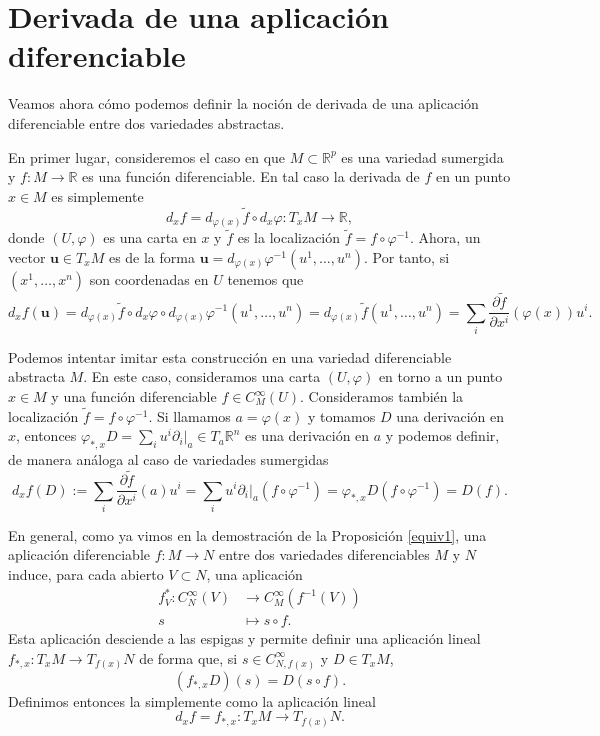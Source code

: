\documentclass[12pt,a4paper]{book}
\theoremstyle{definition} \newtheorem{defn}[thm]{Definición}
\theoremstyle{definition} \newtheorem{ejemplo}[thm]{Ejemplo}
\theoremstyle{definition} \newtheorem{ejercicio}[thm]{Ejercicio}
\theoremstyle{remark} \newtheorem*{obs}{Observación}
\def\RR{\mathbb{R}}
\newcommand{\ve}[1]{\mathbf{#1}}
\let\emph\relax
\begin{document}
	  \section{Derivada de una aplicación diferenciable}
	  Veamos ahora cómo podemos definir la noción de derivada de una aplicación diferenciable entre dos variedades abstractas.

	  En primer lugar, consideremos el caso en que $M\subset \RR^p$ es una variedad sumergida y $f:M\rightarrow \RR$ es una función diferenciable. En tal caso la derivada de $f$ en un punto $x\in M$ es simplemente
	  \begin{equation*}
	    d_x f = d_{\varphi(x)} \tilde{f} \circ d_x\varphi:T_xM \rightarrow \RR,
	  \end{equation*}
	  donde $(U,\varphi)$ es una carta en $x$ y $\tilde{f}$ es la localización $\tilde{f}=f\circ \varphi^{-1}$. Ahora, un vector $\ve{u}\in T_xM$ es de la forma $\ve{u}=d_{\varphi(x)}\varphi^{-1}(u^1,\dots,u^n)$. Por tanto, si $(x^1,\dots,x^n)$ son coordenadas en $U$ tenemos que
	  \begin{equation*}
	    d_xf (\ve{u})=d_{\varphi(x)}\tilde{f} \circ d_x\varphi \circ d_{\varphi(x)}\varphi^{-1}(u^1,\dots,u^n)=d_{\varphi(x)}\tilde{f}(u^1,\dots,u^n)=\sum_i \frac{\partial \tilde{f}}{\partial x^i}(\varphi(x)) u^i.
	  \end{equation*}

	  Podemos intentar imitar esta construcción en una variedad diferenciable abstracta $M$. En este caso, consideramos una carta $(U,\varphi)$ en torno a un punto $x\in M$ y una función diferenciable $f\in C^\infty_M(U)$. Consideramos también la localización $\tilde{f}=f\circ \varphi^{-1}$. Si llamamos $a=\varphi(x)$ y tomamos $D$ una derivación en $x$, entonces $\varphi_{*,x} D=\sum_i u^i \partial_i|_a\in T_a \RR^n$ es una derivación en $a$ y  podemos definir, de manera análoga al caso de variedades sumergidas
	  \begin{equation*}
	    d_xf (D):=\sum_i \frac{\partial \tilde{f}}{\partial x^i}(a) u^i=\sum_i u^i \partial_i|_a (f\circ \varphi^{-1}) =\varphi_{*,x}D (f\circ \varphi^{-1}) = D(f).
	  \end{equation*}

	  En general, como ya vimos en la demostración de la Proposición \ref{equiv1}, una aplicación diferenciable $f:M\rightarrow N$ entre dos variedades diferenciables $M$ y $N$ induce, para cada abierto $V\subset N$, una aplicación
	  \begin{align*}
	    f^*_V :C^\infty_N(V)&\longrightarrow C^\infty_M(f^{-1}(V))\\ 
	      s &\longmapsto s\circ f. 
	    \end{align*}
	    Esta aplicación desciende a las espigas y permite definir una aplicación lineal $f_{*,x}:T_xM \rightarrow T_{f(x)} N$ de forma que, si $s\in C^\infty_{N,f(x)}$ y $D\in T_xM$,
	    \begin{equation*}
	      (f_{*,x} D)(s)=D(s\circ f).
	    \end{equation*}
	    Definimos entonces la \emph{derivada de $f$ en $x$} simplemente como la aplicación lineal $$d_xf=f_{*,x}:T_xM \rightarrow T_{f(x)}N.$$
\end{document}
